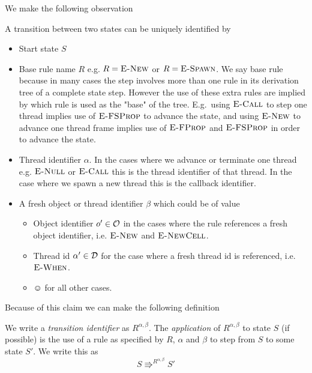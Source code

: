 We make the following observation
\begin{claim}
  A transition between two states can be uniquely identified by
  \begin{itemize}
    \item Start state $S$
    \item Base rule name $R$ e.g. $R = \mbox{{\sc E-New}}$ or $R = \mbox{\sc E-Spawn}$. We say base rule
      because in many cases the step involves more than one rule in its
      derivation tree of a complete state step. However the use of these extra
      rules are implied by which rule is used as the "base" of the tree. E.g.\
      using $\mbox{\sc E-Call}$ to step one thread implies use of $\mbox{\sc E-FSProp}$ to advance the
      state, and using $\mbox{{\sc E-New}}$ to advance one thread frame implies use of
      $\mbox{\sc E-FProp}$ and $\mbox{\sc E-FSProp}$ in order to advance the state.
    \item Thread identifier $\alpha$. In the cases where we advance or terminate
      one thread e.g. $\mbox{{\sc E-Null}}$ or $\mbox{\sc E-Call}$ this is the thread identifier of that
      thread. In the case where we spawn a new thread this is the callback
      identifier.
    \item A fresh object or thread identifier $\beta$ which could be of value
      \begin{itemize}
        \item Object identifier $o' \in \mathcal{O}$ in the cases where the rule
          references a fresh object identifier, i.e. $\mbox{{\sc E-New}}$ and $\mbox{{\sc E-NewCell}}$.
        \item Thread id $\alpha' \in \mathcal{D}$ for the case where a fresh thread id is
          referenced, i.e. $\mbox{{\sc E-When}}$.
        \item $\smiley$ for all other cases.
      \end{itemize}
  \end{itemize}
\end{claim}

Because of this claim we can make the following definition

\begin{definition}
  We write a \emph{transition identifier} as $R^{\alpha, \beta}$. The
  \emph{application} of $R^{\alpha, \beta}$ to state $S$ (if possible) is the
  use of a rule as specified by $R$, $\alpha$ and $\beta$ to step from $S$ to
  some state $S'$. We write this as
  \begin{equation*}
    S \Rrightarrow^{R^{\alpha, \beta}} S'
  \end{equation*}
\end{definition}

